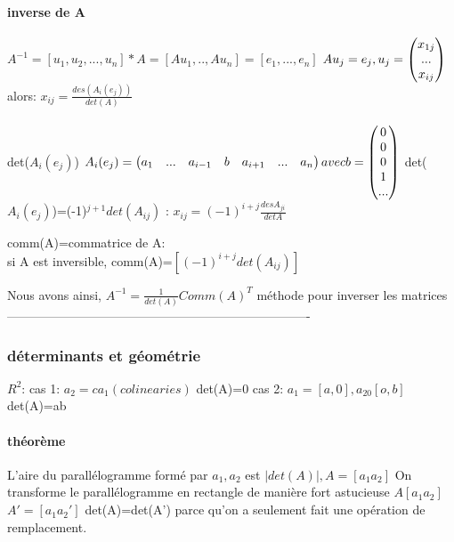 \documentclass[a4paper,10pt]{article}
\begin{document}
\paragraph{inverse de A}
$A^{-1}=[u_1,u_2,...,u_n]*A=[Au_1,..,Au_n]=[e_1,...,e_n]$
\newline
$Au_j=e_j,u_j=
\begin{pmatrix}
x_{1j}\cr
...\cr
x_{ij}\cr
\end{pmatrix}
$
\newline
alors: $x_{ij}=\frac{des(A_i(e_j))}{det(A)}$
\paragraph{}
det($A_i(e_j)$)
\newline
$A_i(e_j)=
\begin{pmatrix}
a_1&...&a_{i-1}&b&a_{i+1}&...&a_n\cr
\end{pmatrix}
avec b=
\begin{pmatrix}
0\cr
0\cr
0\cr
1\cr
...\cr
\end{pmatrix}
$
\newline
det($A_i(e_j)$)=(-1)$^{j+1}det(A_{ij})$ : $x_{ij}=(-1)^{i+j}\frac{des A_{ji}}{det A}$
\begin{description}
 \item comm(A)=commatrice de A:\\{si A est inversible, comm(A)=$[(-1)^{i+j}det(A_{ij})]$}
\end{description}
Nous avons ainsi, $A^{-1}=\frac{1}{det(A)}Comm(A)^T$ méthode pour inverser les matrices 
-------------------------------------------------------------------------
\subsubsection{déterminants et géométrie}
$R^2$:
\newline
cas 1: $a_2 = ca_1 (colinearies)$ det(A)=0
\newline
cas 2: $a_1=[a,0], a_20[o,b]$ det(A)=ab
\newline
\paragraph{théorème}
L'aire du parallélogramme formé par $a_1,a_2$ est $|det(A)|,A=[a_1a_2]$
\newline
On transforme le parallélogramme en rectangle de manière fort astucieuse $A[a_1a_2]$ $A'=[a_1a_2']$
\newline
det(A)=det(A')  parce qu'on a seulement fait une opération de remplacement.
\end{document}
